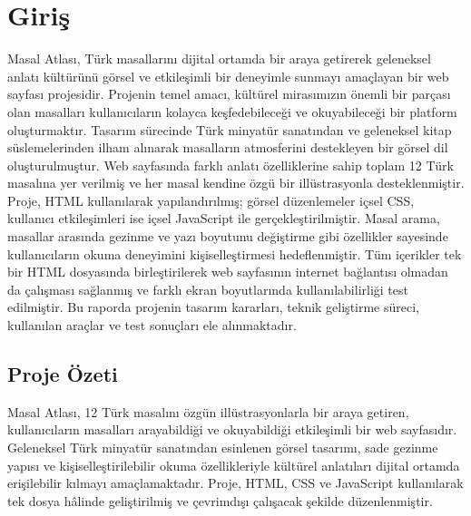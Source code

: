 \documentclass[12pt,a4paper]{article}
\begin{document}
\section{Giriş}
Masal Atlası, Türk masallarını dijital ortamda bir araya getirerek geleneksel anlatı kültürünü görsel ve etkileşimli bir deneyimle sunmayı amaçlayan bir web sayfası projesidir. Projenin temel amacı, kültürel mirasımızın önemli bir parçası olan masalları kullanıcıların kolayca keşfedebileceği ve okuyabileceği bir platform oluşturmaktır. Tasarım sürecinde Türk minyatür sanatından ve geleneksel kitap süslemelerinden ilham alınarak masalların atmosferini destekleyen bir görsel dil oluşturulmuştur. Web sayfasında farklı anlatı özelliklerine sahip toplam 12 Türk masalına yer verilmiş ve her masal kendine özgü bir illüstrasyonla desteklenmiştir. Proje, HTML kullanılarak yapılandırılmış; görsel düzenlemeler içsel CSS, kullanıcı etkileşimleri ise içsel JavaScript ile gerçekleştirilmiştir. Masal arama, masallar arasında gezinme ve yazı boyutunu değiştirme gibi özellikler sayesinde kullanıcıların okuma deneyimini kişiselleştirmesi hedeflenmiştir. Tüm içerikler tek bir HTML dosyasında birleştirilerek web sayfasının internet bağlantısı olmadan da çalışması sağlanmış ve farklı ekran boyutlarında kullanılabilirliği test edilmiştir. Bu raporda projenin tasarım kararları, teknik geliştirme süreci, kullanılan araçlar ve test sonuçları ele alınmaktadır.

\subsection{Proje Özeti}
Masal Atlası, 12 Türk masalını özgün illüstrasyonlarla bir araya getiren, kullanıcıların masalları arayabildiği ve okuyabildiği etkileşimli bir web sayfasıdır. Geleneksel Türk minyatür sanatından esinlenen görsel tasarımı, sade gezinme yapısı ve kişiselleştirilebilir okuma özellikleriyle kültürel anlatıları dijital ortamda erişilebilir kılmayı amaçlamaktadır. Proje, HTML, CSS ve JavaScript kullanılarak tek dosya hâlinde geliştirilmiş ve çevrimdışı çalışacak şekilde düzenlenmiştir.
\end{document}
